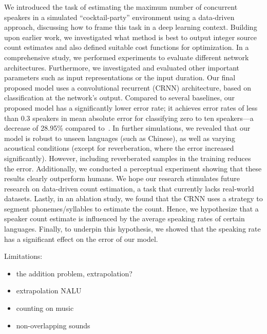 We introduced the task of estimating the maximum number of concurrent speakers in a simulated ``cocktail-party'' environment using a data-driven approach, discussing how to frame this task in a deep learning context.
Building upon earlier work, we investigated what method is best to output integer source count estimates and also defined suitable cost functions for optimization.
In a comprehensive study, we performed experiments to evaluate different network architectures.
Furthermore, we investigated and evaluated other important parameters such as input representations or the input duration.
Our final proposed model uses a convolutional recurrent (CRNN) architecture, based on classification at the network's output.
Compared to several baselines, our proposed model has a significantly lower error rate;
it achieves error rates of less than 0.3 speakers in mean absolute error for classifying zero to ten speakers---a decrease of 28.95\% compared to~\cite{stoeter17}.
In further simulations, we revealed that our model is robust to unseen languages (such as Chinese), as well as varying acoustical conditions (except for reverberation, where the error increased significantly).
However, including reverberated samples in the training reduces the error.
Additionally, we conducted a perceptual experiment showing that these results clearly outperform humans.
We hope our research stimulates future research on data-driven count estimation, a task that currently lacks real-world datasets.
Lastly, in an ablation study, we found that the CRNN uses a strategy to segment phonemes/syllables to estimate the count.
Hence, we hypothesize that a speaker count estimate is influenced by the average speaking rates of certain languages.
Finally, to underpin this hypothesis, we showed that the speaking rate has a significant effect on the error of our model.

Limitations:
\begin{itemize}
  \item the addition problem, extrapolation?
  \item extrapolation NALU
  \item counting on music
  \item non-overlapping sounds
\end{itemize}
